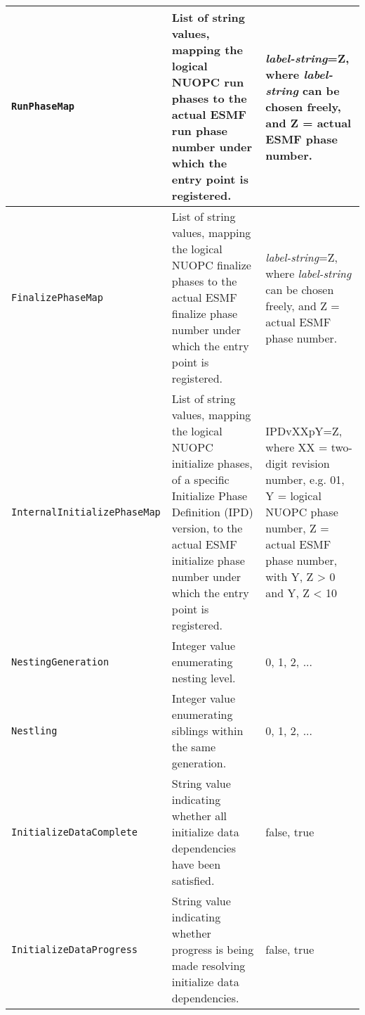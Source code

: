 \begin{longtable}{|p{}|p{}|p{}|}
     {\tt RunPhaseMap} & List of string values, mapping the logical NUOPC run phases to the actual ESMF run phase number under which the entry point is registered.& {\em label-string}=Z, where {\em label-string} can be chosen freely, and Z = actual ESMF phase number. \\ \hline
     {\tt FinalizePhaseMap} & List of string values, mapping the logical NUOPC finalize phases to the actual ESMF finalize phase number under which the entry point is registered.& {\em label-string}=Z, where {\em label-string} can be chosen freely, and Z = actual ESMF phase number. \\ \hline
     {\tt Internal\-InitializePhaseMap} & List of string values, mapping the logical NUOPC initialize phases, of a specific Initialize Phase Definition (IPD) version, to the actual ESMF initialize phase number under which the entry point is registered.& IPDvXXpY=Z, where XX = two-digit revision number, e.g. 01, Y = logical NUOPC phase number, Z = actual ESMF phase number, with Y, Z > 0 and Y, Z < 10 \\ \hline
     {\tt NestingGeneration} & Integer value enumerating nesting level.& 0, 1, 2, ...\\ \hline
     {\tt Nestling} & Integer value enumerating siblings within the same generation.& 0, 1, 2, ...\\ \hline
     {\tt Initialize\-DataComplete} & String value indicating whether all initialize data dependencies have been satisfied.& false, true\\ \hline
     {\tt Initialize\-DataProgress} & String value indicating whether progress is being made resolving initialize data dependencies.& false, true\\ \hline
     \hline
\end{longtable}
